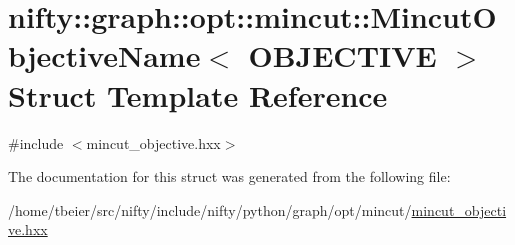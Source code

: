 \hypertarget{structnifty_1_1graph_1_1opt_1_1mincut_1_1MincutObjectiveName}{}\section{nifty\+:\+:graph\+:\+:opt\+:\+:mincut\+:\+:Mincut\+Objective\+Name$<$ O\+B\+J\+E\+C\+T\+I\+VE $>$ Struct Template Reference}
\label{structnifty_1_1graph_1_1opt_1_1mincut_1_1MincutObjectiveName}


{\ttfamily \#include $<$mincut\+\_\+objective.\+hxx$>$}



The documentation for this struct was generated from the following file\+:\begin{DoxyCompactItemize}
\item 
/home/tbeier/src/nifty/include/nifty/python/graph/opt/mincut/\hyperlink{python_2graph_2opt_2mincut_2mincut__objective_8hxx}{mincut\+\_\+objective.\+hxx}\end{DoxyCompactItemize}

